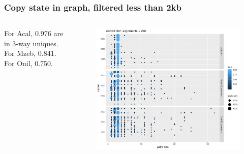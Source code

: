 \documentclass[aspectratio=169]{beamer}
\begin{document}
\begin{frame}
  \frametitle{Copy state in graph, filtered less than 2kb}
  \begin{columns}[c] %
    For Acal, 0.976 are in 3-way uniques.
    For Mzeb, 0.841.
    For Onil, 0.750.
    \begin{figure}
      \includegraphics[scale=0.42,center]{cichlid_chr1_fpal2k_busco_multicov_len_vs_path_size.png}
    \end{figure}
    \end{columns}
\end{frame}
\end{document}
